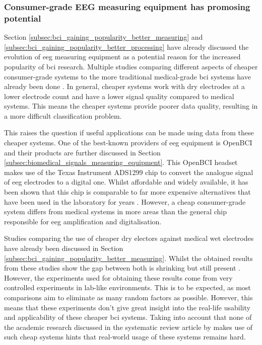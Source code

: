 
\subsubsection{Consumer-grade EEG measuring equipment has promosing potential}
\label{subsubsec:bci_opportunities_obstacles_motivating_cheap_hardware_promosing}

Section \ref{subsec:bci_gaining_popularity_better_measuring} and \ref{subsec:bci_gaining_popularity_better_processing} have already discussed the evolution of \gls{eeg} measuring equipment as a potential reason for the increased popularity of \gls{bci} research.
Multiple studies comparing different aspects of cheaper consumer-grade systems to the more traditional medical-grade \gls{bci} systems have already been done \citep{openbci_vs_medical, openbci_eeg_sensor_evaluation, dry_electrode_status, wet_dry_comparison_experiment, wireless_dry_vs_wired_wet}.
In general, cheaper systems work with dry electrodes at a lower electrode count and have a lower signal quality compared to medical systems.
This means the cheaper systems provide poorer data quality, resulting in a more difficult classification problem.

This raises the question if useful applications can be made using data from these cheaper systems.
One of the best-known providers of \gls{eeg} equipment is OpenBCI and their products are further discussed in Section \ref{subsec:biomedical_signals_measuring_equipment}.
This OpenBCI headset makes use of the Texas Instrument ADS1299 chip to convert the analogue signal of \gls{eeg} electrodes to a digital one.
Whilst affordable and widely available, it has been shown that this chip is comparable to far more expensive alternatives that have been used in the laboratory for years \citep{openbci_eeg_sensor_evaluation, openbci_vs_medical}.
However, a cheap consumer-grade system differs from medical systems in more areas than the general chip responsible for \gls{eeg} amplification and digitalisation.

Studies comparing the use of cheaper dry electors against medical wet electrodes have already been discussed in Section \ref{subsec:bci_gaining_popularity_better_measuring}.
Whilst the obtained results from these studies show the gap between both is shrinking but still present \citep{wet_vs_dry, dry_electrode_status, wet_dry_comparison_experiment}.
However, the experiments used for obtaining these results come from very controlled experiments in lab-like environments.
This is to be expected, as most comparisons aim to eliminate as many random factors as possible.
However, this means that these experiments don't give great insight into the real-life usability and applicability of these cheaper \gls{bci} systems.
Taking into account that none of the academic research discussed in the systematic review article by \citet{bci_review_arnau} makes use of such cheap systems hints that real-world usage of these systems remains hard.


